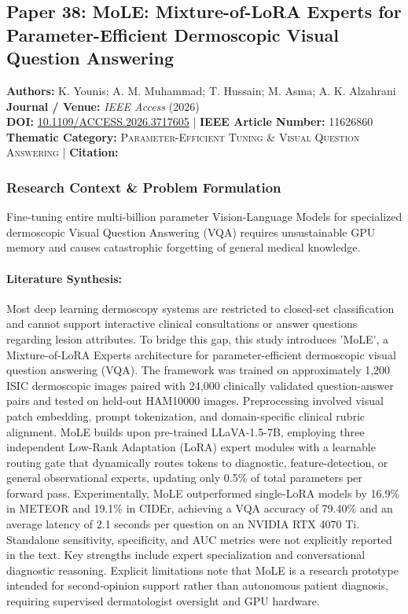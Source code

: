 \subsection{Paper 38: MoLE: Mixture-of-LoRA Experts for Parameter-Efficient Dermoscopic Visual Question Answering}
\label{sec:paper_38}

\begin{tcolorbox}[colback=gray!5!white,colframe=gray!75!black,title=\textbf{Metadata \& Citation Summary}]
\textbf{Authors:} K. Younis; A. M. Muhammad; T. Hussain; M. Asma; A. K. Alzahrani \\
\textbf{Journal / Venue:} \textit{IEEE Access} (2026) \\
\textbf{DOI:} \href{https://doi.org/10.1109/ACCESS.2026.3717605}{10.1109/ACCESS.2026.3717605} \quad | \quad \textbf{IEEE Article Number:} 11626860 \\
\textbf{Thematic Category:} \textsc{Parameter-Efficient Tuning \& Visual Question Answering} \quad | \quad \textbf{Citation:} \cite{11626860}
\end{tcolorbox}

\subsubsection*{Research Context \& Problem Formulation}
Fine-tuning entire multi-billion parameter Vision-Language Models for specialized dermoscopic Visual Question Answering (VQA) requires unsustainable GPU memory and causes catastrophic forgetting of general medical knowledge.

\paragraph{Literature Synthesis:} Most deep learning dermoscopy systems are restricted to closed-set classification and cannot support interactive clinical consultations or answer questions regarding lesion attributes. To bridge this gap, this study introduces 'MoLE', a Mixture-of-LoRA Experts architecture for parameter-efficient dermoscopic visual question answering (VQA). The framework was trained on approximately 1,200 ISIC dermoscopic images paired with 24,000 clinically validated question-answer pairs and tested on held-out HAM10000 images. Preprocessing involved visual patch embedding, prompt tokenization, and domain-specific clinical rubric alignment. MoLE builds upon pre-trained LLaVA-1.5-7B, employing three independent Low-Rank Adaptation (LoRA) expert modules with a learnable routing gate that dynamically routes tokens to diagnostic, feature-detection, or general observational experts, updating only 0.5\% of total parameters per forward pass. Experimentally, MoLE outperformed single-LoRA models by 16.9\% in METEOR and 19.1\% in CIDEr, achieving a VQA accuracy of 79.40\% and an average latency of 2.1 seconds per question on an NVIDIA RTX 4070 Ti. Standalone sensitivity, specificity, and AUC metrics were not explicitly reported in the text. Key strengths include expert specialization and conversational diagnostic reasoning. Explicit limitations note that MoLE is a research prototype intended for second-opinion support rather than autonomous patient diagnosis, requiring supervised dermatologist oversight and GPU hardware.

